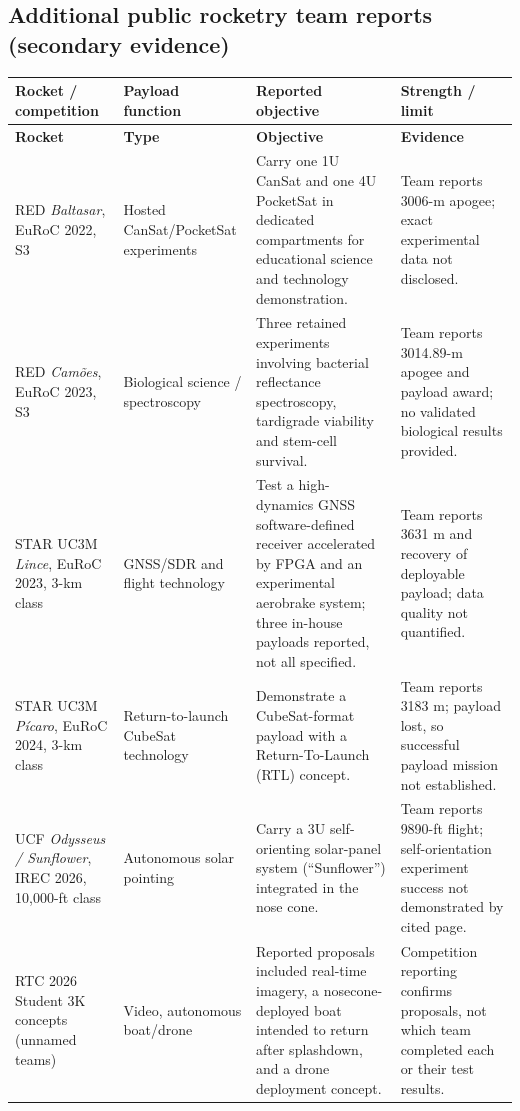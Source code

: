 \documentclass[10pt,a4paper]{article}
\begin{document}
\subsection{Additional public rocketry team reports (secondary evidence)}
\small
\begin{longtable}{@{}L{34mm}L{33mm}L{52mm}L{29mm}@{}}
\toprule{}\textbf{Rocket / competition} & \textbf{Payload function} & \textbf{Reported objective} & \textbf{Strength / limit}\\\midrule\endfirsthead
\toprule{}\textbf{Rocket} & \textbf{Type} & \textbf{Objective} & \textbf{Evidence}\\\midrule\endhead
\bottomrule\endlastfoot
RED \emph{Baltasar}, EuRoC 2022, S3 \cite{red2022baltasar} & Hosted CanSat/PocketSat experiments & Carry one 1U CanSat and one 4U PocketSat in dedicated compartments for educational science and technology demonstration. & Team reports 3006-m apogee; exact experimental data not disclosed.\\
RED \emph{Cam\~oes}, EuRoC 2023, S3 \cite{red2023camoes} & Biological science / spectroscopy & Three retained experiments involving bacterial reflectance spectroscopy, tardigrade viability and stem-cell survival. & Team reports 3014.89-m apogee and payload award; no validated biological results provided.\\
STAR UC3M \emph{Lince}, EuRoC 2023, 3-km class \cite{star2023lince} & GNSS/SDR and flight technology & Test a high-dynamics GNSS software-defined receiver accelerated by FPGA and an experimental aerobrake system; three in-house payloads reported, not all specified. & Team reports 3631 m and recovery of deployable payload; data quality not quantified.\\
STAR UC3M \emph{P\'icaro}, EuRoC 2024, 3-km class \cite{star2024picaro} & Return-to-launch CubeSat technology & Demonstrate a CubeSat-format payload with a Return-To-Launch (RTL) concept. & Team reports 3183 m; payload lost, so successful payload mission not established.\\
UCF \emph{Odysseus / Sunflower}, IREC 2026, 10,000-ft class \cite{ucf2026odysseus} & Autonomous solar pointing & Carry a 3U self-orienting solar-panel system (``Sunflower'') integrated in the nose cone. & Team reports 9890-ft flight; self-orientation experiment success not demonstrated by cited page.\\
RTC 2026 Student 3K concepts (unnamed teams) \cite{tasa2026report} & Video, autonomous boat/drone & Reported proposals included real-time imagery, a nosecone-deployed boat intended to return after splashdown, and a drone deployment concept. & Competition reporting confirms proposals, not which team completed each or their test results.\\
\end{longtable}
\normalsize
\end{document}
